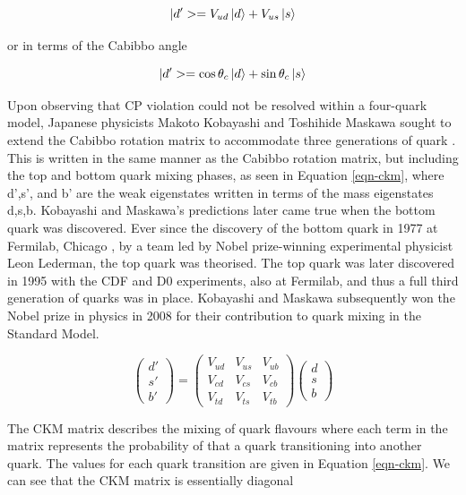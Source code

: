 \begin{equation}
|d'> = V_{ud}\ket{d} + V_{us}\ket{s}
\end{equation}

or in terms of the Cabibbo angle 

\begin{equation}
|d'> = \cos\theta_c\ket{d} + \sin\theta_c\ket{s}
\end{equation}

Upon observing that CP violation could not be resolved within a four-quark model, Japanese physicists Makoto Kobayashi and Toshihide Maskawa sought to extend the Cabibbo rotation matrix to accommodate three generations of quark \cite{Kobayashi:1973fv}. This is written in the same manner as the Cabibbo rotation matrix, but including the top and bottom quark mixing phases, as seen in Equation \ref{eqn-ckm}, where d',s', and b' are the weak eigenstates written in terms of the mass eigenstates d,s,b. Kobayashi and Maskawa's predictions later came true when the bottom quark was discovered. Ever since the discovery of the bottom quark in 1977 at Fermilab, Chicago \cite{Innes:1977ae}, by a team led by Nobel prize-winning experimental physicist Leon Lederman, the top quark was theorised. The top quark was later discovered in 1995 with the CDF \cite{PhysRevLett.74.2626} and D0 \cite{PhysRevLett.74.2422} experiments, also at Fermilab, and thus a full third generation of quarks was in place. Kobayashi and Maskawa subsequently won the Nobel prize in physics in 2008 for their contribution to quark mixing in the Standard Model.   

\begin{equation} \label{equ-CKM}
\begin{pmatrix}
d' \\
s' \\
b' 
\end{pmatrix}
=
\begin{pmatrix}
V_{ud} & V_{us} & V_{ub} \\
V_{cd} & V_{cs} & V_{cb} \\
V_{td} & V_{ts} & V_{tb} 
\end{pmatrix}
\begin{pmatrix}
d \\
s \\
b 
\end{pmatrix}
\end{equation}

The CKM matrix describes the mixing of quark flavours where each term in the matrix represents the probability of that a quark transitioning into another quark. The values for each quark transition are given in Equation \ref{eqn-ckm}. We can see that the CKM matrix is essentially diagonal %

